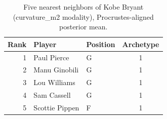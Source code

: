 \begin{table}[htbp]
  \centering\small
  \begin{tabular}{rllc}
    \toprule
    Rank & Player & Position & Archetype \\
    \midrule
    1 & Paul Pierce & G & 1 \\
    2 & Manu Ginobili & G & 1 \\
    3 & Lou Williams & G & 1 \\
    4 & Sam Cassell & G & 1 \\
    5 & Scottie Pippen & F & 1 \\
    \bottomrule
  \end{tabular}
  \caption{Five nearest neighbors of Kobe Bryant (curvature_m2 modality), Procrustes-aligned posterior mean.}
  \label{tab:Kobe_Bryant_neighbors_curvature_m2}
\end{table}

